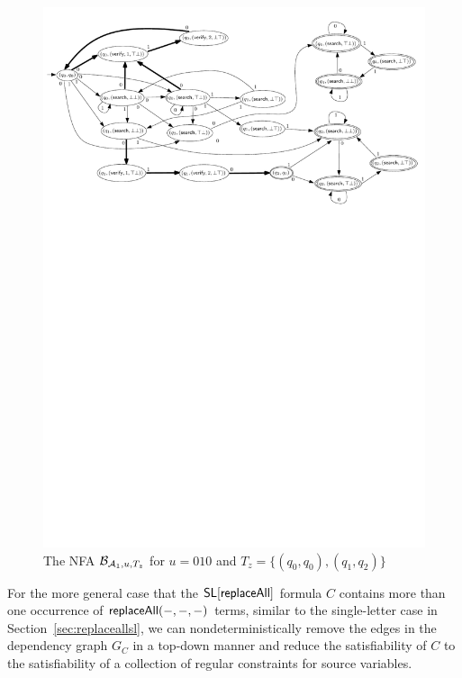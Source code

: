 \begin{example}
\begin{figure}[htbp]
\begin{center}
\includegraphics[scale=0.68]{constant-string-example-2.pdf}
\end{center}
\caption{The NFA $\mathcal{B}_{\mathcal{A}_1, u, T_z}$ for $u = 010$ and $T_z= \{(q_0,q_0),(q_1,q_2)\}$}\label{fig-cs-exmp-2}
\end{figure}
\end{example}

For the more general case that the $\mathsf{SL}[\mathsf{replaceAll}]$ formula $C$ contains more than one occurrence of $\mathsf{replaceAll}(-, -, -)$ terms, similar to the single-letter case in Section~\ref{sec:replaceallsl}, we can nondeterministically remove the edges in the dependency graph $G_C$ in a top-down manner and reduce the satisfiability of $C$ to the satisfiability of a collection of regular constraints for source variables.

